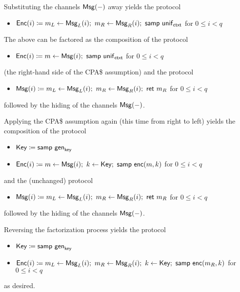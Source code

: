 Substituting the channels $\mathsf{Msg}(-)$ away yields the protocol
\begin{itemize}
\item $\mathsf{Enc}(i) \coloneqq m_L \leftarrow \mathsf{Msg}_L(i); \ m_R \leftarrow \mathsf{Msg}_R(i); \ \mathsf{samp} \ \mathsf{unif}_{\mathsf{ctxt}}$ for $0 \leq i < q$
\end{itemize}

The above can be factored as the composition of the protocol
\begin{itemize}
\item $\mathsf{Enc}(i) \coloneqq m \leftarrow \mathsf{Msg}(i); \ \mathsf{samp} \ \mathsf{unif}_{\mathsf{ctxt}}$ for $0 \leq i < q$
\end{itemize}
(the right-hand side of the CPA\$ assumption) and the protocol
\begin{itemize}
\item $\mathsf{Msg}(i) \coloneqq m_L \leftarrow \mathsf{Msg}_L(i); \ m_R \leftarrow \mathsf{Msg}_R(i); \ \mathsf{ret} \ m_R$ for $0 \leq i < q$
\end{itemize}
followed by the hiding of the channels $\mathsf{Msg}(-)$.

Applying the CPA\$ assumption again (this time from right to left) yields the composition of the protocol
\begin{itemize}
\item $\mathsf{Key} \coloneqq \mathsf{samp} \ \mathsf{gen}_{\mathsf{key}}$
\item $\mathsf{Enc}(i) \coloneqq m \leftarrow \mathsf{Msg}(i); \ k \leftarrow \mathsf{Key}; \ \mathsf{samp} \ \mathsf{enc}(m, k)$ for $0 \leq i < q$
\end{itemize}
and the (unchanged) protocol
\begin{itemize}
\item $\mathsf{Msg}(i) \coloneqq m_L \leftarrow \mathsf{Msg}_L(i); \ m_R \leftarrow \mathsf{Msg}_R(i); \ \mathsf{ret} \ m_R$ for $0 \leq i < q$
\end{itemize}
followed by the hiding of the channels $\mathsf{Msg}(-)$.

Reversing the factorization process yields the protocol
\begin{itemize}
\item $\mathsf{Key} \coloneqq \mathsf{samp} \ \mathsf{gen}_{\mathsf{key}}$
\item $\Enc(i) \coloneqq m_L \leftarrow \MsgL(i); \ m_R \leftarrow \MsgR(i); \ k \leftarrow \Key; \ \samp{\enc(m_R, k)}$ for $0 \leq i < q$
\end{itemize}
as desired.